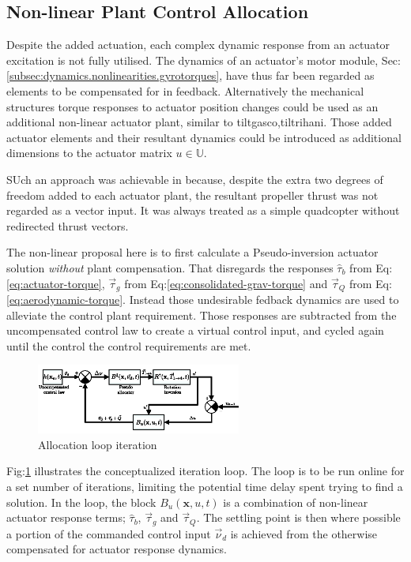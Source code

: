 \subsection{Non-linear Plant Control Allocation}
\label{subsec:control.allocation.nonlinear}
Despite the added actuation, each complex dynamic response from an actuator excitation is not fully utilised. The dynamics of an actuator's motor module, Sec:\ref{subsec:dynamics.nonlinearities.gyrotorques}, have thus far been regarded as elements to be compensated for in feedback. Alternatively the mechanical structures torque responses to actuator position changes could be used as an additional non-linear actuator plant, similar to {tiltgasco,tiltrihani}. Those added actuator elements and their resultant dynamics could be introduced as additional dimensions to the actuator matrix $u\in\mathbb{U}$. 
\par
SUch an approach was achievable in \cite{tiltgasco,tiltrihani} because, despite the extra two degrees of freedom added to each actuator plant, the resultant propeller thrust was not regarded as a vector input. It was always treated as a simple quadcopter without redirected thrust vectors.
\par
The non-linear proposal here is to first calculate a Pseudo-inversion actuator solution \emph{without} plant compensation. That disregards the responses $\hat{\tau}_b$ from Eq:\ref{eq:actuator-torque}, $\vec{\tau}_g$ from Eq:\ref{eq:consolidated-grav-torque} and $\vec{\tau}_Q$ from Eq:\ref{eq:aerodynamic-torque}. Instead those undesirable fedback dynamics are used to alleviate the control plant requirement. Those responses are subtracted from the uncompensated control law to create a virtual control input, and cycled again until the control the control requirements are met.
\par
\begin{figure}[hbtp]
\centering
\includegraphics[width=0.6\textwidth]{figs/allocation}
\caption{Allocation loop iteration}
\label{fig:non-linear-allocation}
\end{figure}
Fig:\ref{fig:non-linear-allocation} illustrates the conceptualized iteration loop. The loop is to be run online for a set number of iterations, limiting the potential time delay spent trying to find a solution. In the loop, the block $B_u(\mathbf{x},u,t)$ is a combination of non-linear actuator response terms; $\hat{\tau}_b$, $\vec{\tau}_g$ and $\vec{\tau}_Q$. The settling point is then where possible a portion of the commanded control input $\vec{\nu}_d$ is achieved from the otherwise compensated for actuator response dynamics.